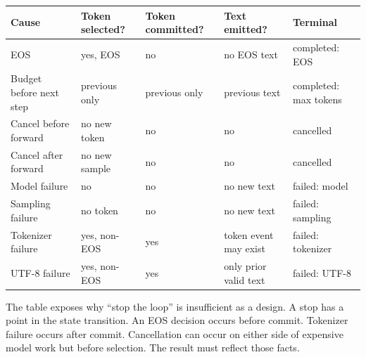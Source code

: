 \documentclass[
  10pt,
]{article}
\newcounter{none} %
\begin{document}
{\def\LTcaptype{none} %
\begin{longtable}[]{@{}
  >{\raggedright\arraybackslash}p{}
  >{\raggedright\arraybackslash}p{}
  >{\raggedright\arraybackslash}p{}
  >{\raggedright\arraybackslash}p{}
  >{\raggedright\arraybackslash}p{}@{}}
\toprule\noalign{}
\begin{minipage}[b]{\linewidth}\raggedright
Cause
\end{minipage} & \begin{minipage}[b]{\linewidth}\raggedright
Token selected?
\end{minipage} & \begin{minipage}[b]{\linewidth}\raggedright
Token committed?
\end{minipage} & \begin{minipage}[b]{\linewidth}\raggedright
Text emitted?
\end{minipage} & \begin{minipage}[b]{\linewidth}\raggedright
Terminal
\end{minipage} \\
\midrule\noalign{}
\endhead
\bottomrule\noalign{}
\endlastfoot
EOS & yes, EOS & no & no EOS text & completed: EOS \\
Budget before next step & previous only & previous only & previous text
& completed: max tokens \\
Cancel before forward & no new token & no & no & cancelled \\
Cancel after forward & no new sample & no & no & cancelled \\
Model failure & no & no & no new text & failed: model \\
Sampling failure & no token & no & no new text & failed: sampling \\
Tokenizer failure & yes, non-EOS & yes & token event may exist & failed:
tokenizer \\
UTF-8 failure & yes, non-EOS & yes & only prior valid text & failed:
UTF-8 \\
\end{longtable}
}

The table exposes why ``stop the loop'' is insufficient as a design. A
stop has a point in the state transition. An EOS decision occurs before
commit. Tokenizer failure occurs after commit. Cancellation can occur on
either side of expensive model work but before selection. The result
must reflect those facts.
\end{document}
